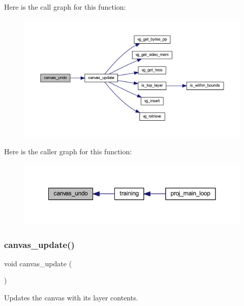 Here is the call graph for this function\+:\nopagebreak
\begin{figure}[H]
\begin{center}
\leavevmode
\includegraphics[width=350pt]{group__canvas_ga96be607ebdf4fda25a050f017d68db93_cgraph}
\end{center}
\end{figure}
Here is the caller graph for this function\+:\nopagebreak
\begin{figure}[H]
\begin{center}
\leavevmode
\includegraphics[width=350pt]{group__canvas_ga96be607ebdf4fda25a050f017d68db93_icgraph}
\end{center}
\end{figure}
\mbox{\label{group__canvas_gab462a38a3f3a612931c008e28e816a8d}} 
\subsubsection{\texorpdfstring{canvas\+\_\+update()}{canvas\_update()}}
{\footnotesize\ttfamily void canvas\+\_\+update (\begin{DoxyParamCaption}{ }\end{DoxyParamCaption})}



Updates the canvas with its layer contents. 

